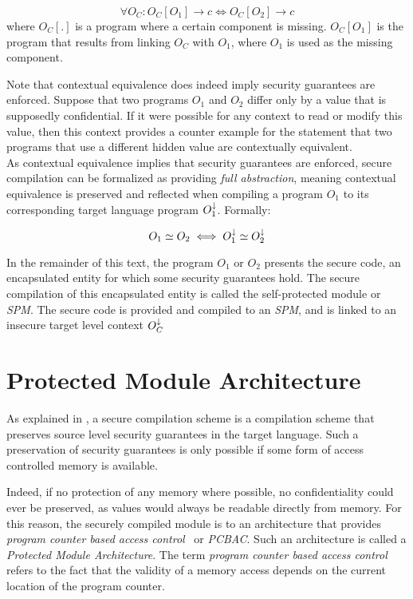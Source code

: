 \[
    \forall O_C : O_C[O_{1}] \rightarrow c \iff O_C[O_{2}] \rightarrow c
\]
where $O_{C}[.]$ is a program where a certain component is missing. 
$O_{C}[O_1]$ is the program that results from linking $O_C$ with $O_1$, where $O_1$ is used as the missing component.

Note that contextual equivalence does indeed imply security guarantees are enforced.
Suppose that two programs $O_1$ and $O_2$ differ only by a value that is supposedly confidential.
If it were possible for any context to read or modify this value, then this context provides a counter example for the statement that two programs that use a different hidden value are contextually equivalent.
\\[1em]
As contextual equivalence implies that security guarantees are enforced, secure compilation can be formalized as providing \emph{full abstraction}, meaning contextual equivalence is preserved and reflected when compiling a program $O_1$ to its corresponding target language program $O_1^{\downarrow}$. 
Formally:

\[
    O_{1} \simeq O_{2} \iff O_{1}^{\downarrow} \simeq O_{2}^{\downarrow}
\]

In the remainder of this text, the program $O_1$ or $O_2$ presents the secure code, an encapsulated entity for which some security guarantees hold.
The secure compilation of this encapsulated entity is called the self-protected module or \emph{SPM}.
The secure code is provided and compiled to an \emph{SPM}, and is linked to an insecure target level context $O_C^{\downarrow}$

\section{Protected Module Architecture}
\label{sec:protectedmodulearchitecture}
As explained in , a secure compilation scheme is a compilation scheme that preserves source level security guarantees in the target language.
Such a preservation of security guarantees is only possible if some form of access controlled memory is available.

Indeed, if no protection of any memory where possible, no confidentiality could ever be preserved, as values would always be readable directly from memory.
For this reason, the securely compiled module is to an architecture that provides \emph{program counter based access control}~\cite{PCBAC} or \emph{PCBAC}.
Such an architecture is called a \emph{Protected Module Architecture}. 
The term \emph{program counter based access control} refers to the fact that the validity of a memory access depends on the current location of the program counter.

